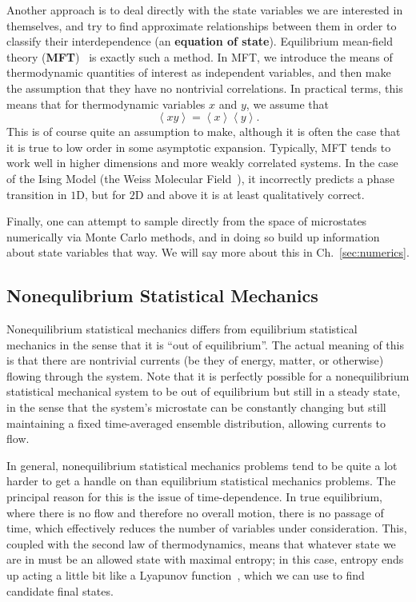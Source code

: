 Another approach is to deal directly with the state variables we are interested in themselves,
and try to find approximate relationships between them in order to classify their interdependence (an
\textbf{equation of state}). Equilibrium mean-field theory
(\textbf{MFT})~\cite{honig1999} is exactly such a method.
In MFT, we introduce the means of thermodynamic quantities of interest as independent
variables, and then make the assumption that they have no nontrivial correlations. In practical terms,
this means that for thermodynamic variables $x$ and $y$, we assume that
\begin{equation}
 \left\langle x y \right\rangle = \left\langle x  \right\rangle \left\langle y \right\rangle.
\end{equation}
This is of course quite an assumption to make, although it is often the case that it is true to low
order in some asymptotic expansion. Typically, MFT tends to work well in higher dimensions and more
weakly correlated systems. In the case of the Ising Model (the Weiss Molecular Field~\cite{van1945}), it incorrectly predicts a phase transition
in $1$D, but for $2$D and above it is at least qualitatively correct.

Finally, one can attempt to sample directly from the space of microstates numerically via Monte Carlo
methods, and in doing so build up information about state variables that way.
We will say more about this in Ch.~\ref{sec:numerics}.

\subsection{Nonequlibrium Statistical Mechanics}
Nonequilibrium statistical mechanics differs from equilibrium statistical mechanics in the sense that
it is ``out of equilibrium''. The actual meaning of this is that there are nontrivial currents
(be they of energy, matter, or otherwise) flowing through the system. Note that it is perfectly
possible for a nonequilibrium statistical mechanical system to be out of equilibrium but still in a
steady state, in the sense that the system's microstate can be constantly changing but still
maintaining a fixed time-averaged ensemble distribution, allowing currents to flow.

In general, nonequilibrium statistical mechanics problems tend to be quite a lot harder to get 
a handle on than equilibrium statistical mechanics problems. The principal reason for this is the
issue of time-dependence. In true equilibrium, where there is no flow and therefore no overall motion,
there is no passage of time, which effectively reduces the number of variables under consideration. This, coupled with the second law of thermodynamics, means that whatever state we are
in must be an allowed state with maximal entropy; in this case, entropy ends up acting a little bit
like a Lyapunov function~\cite{pukdeboon2011}, which we can use to find candidate final states. 

